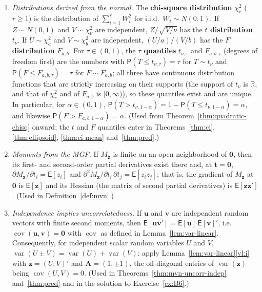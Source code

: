 \documentclass[14pt]{extarticle}
\theoremstyle{plain}
\theoremstyle{definition}
\theoremstyle{remark}
\newcommand\expc{\mathsf{E}}
\newcommand\prb{\mathsf{P}}
\DeclareMathOperator\var{var}
\DeclareMathOperator\cov{cov}
\newcommand{\bzero}{\mathbf{0}}
\newcommand{\bz}{\mathbf{z}}
\newcommand{\bA}{\mathbf{A}}
\newcommand{\bv}{\mathbf{v}}
\newcommand{\Real}{\mathbb{R}}
\newcommand{\bu}{\mathbf{u}}
\begin{document}
\begin{enumerate}[label=\textup{(N\arabic*)}]
\item\label{N5} \emph{Distributions derived from the normal.} The \textbf{chi-square distribution} $\chi^2_r$ ($r \geqslant 1$) is the distribution of $\sum_{i=1}^r W_i^2$ for i.i.d.\ $W_i \sim N(0,1)$. If $Z \sim N(0,1)$ and $V \sim \chi^2_\nu$ are independent, $Z/\sqrt{V/\nu}$ has the \textbf{$t$ distribution} $t_\nu$. If $U \sim \chi^2_a$ and $V \sim \chi^2_b$ are independent, $(U/a)/(V/b)$ has the \textbf{$F$ distribution} $F_{a,b}$. For $\tau \in (0,1)$, the \textbf{$\tau$ quantiles} $t_{\nu,\tau}$ and $F_{a,b,\tau}$ (degrees of freedom first) are the numbers with $\prb(T \leqslant t_{\nu,\tau}) = \tau$ for $T \sim t_\nu$ and $\prb(F \leqslant F_{a,b,\tau}) = \tau$ for $F \sim F_{a,b}$; all three have continuous distribution functions that are strictly increasing on their supports (the support of $t_\nu$ is $\Real$, and that of $\chi^2_r$ and of $F_{a,b}$ is $[0, \infty)$), so these quantiles exist and are unique. In particular, for $\alpha \in (0,1)$, $\prb(T > t_{\nu,1-\alpha}) = 1 - \prb(T \leqslant t_{\nu,1-\alpha}) = \alpha$, and likewise $\prb(F > F_{a,b,1-\alpha}) = \alpha$. (Used from Theorem~\ref{thm:quadratic-chisq} onward; the $t$ and $F$ quantiles enter in Theorems~\ref{thm:ci}, \ref{thm:ellipsoid}, \ref{thm:ci-mean} and~\ref{thm:pred}.)
\item\label{N6} \emph{Moments from the MGF.} If $M_{\bz}$ is finite on an open neighborhood of $\bzero$, then its first- and second-order partial derivatives exist there and, at $\mathbf{t} = \bzero$, $\partial M_{\bz}/\partial t_i = \expc[z_i]$ and $\partial^2 M_{\bz}/\partial t_i\,\partial t_j = \expc[z_iz_j]$; that is, the gradient of $M_{\bz}$ at $\bzero$ is $\expc[\bz]$ and its Hessian (the matrix of second partial derivatives) is $\expc[\bz\bz']$. (Used in Definition~\ref{def:mvn}.)
\item\label{N7} \emph{Independence implies uncorrelatedness.} If $\bu$ and $\bv$ are independent random vectors with finite second moments, then $\expc[\bu\bv'] = \expc[\bu]\,\expc[\bv]'$, i.e.\ $\cov(\bu, \bv) = \bzero$ with $\cov$ as defined in Lemma~\ref{lem:var-linear}. Consequently, for independent scalar random variables $U$ and $V$, $\var(U \pm V) = \var(U) + \var(V)$: apply Lemma~\ref{lem:var-linear}\ref{vl:i} with $\bz = (U, V)'$ and $\bA = (1, \pm 1)$, the off-diagonal entries of $\var(\bz)$ being $\cov(U, V) = 0$. (Used in Theorems~\ref{thm:mvn-uncorr-indep} and~\ref{thm:pred} and in the solution to Exercise~\ref{ex:B6}.)
\end{enumerate}
\end{document}
